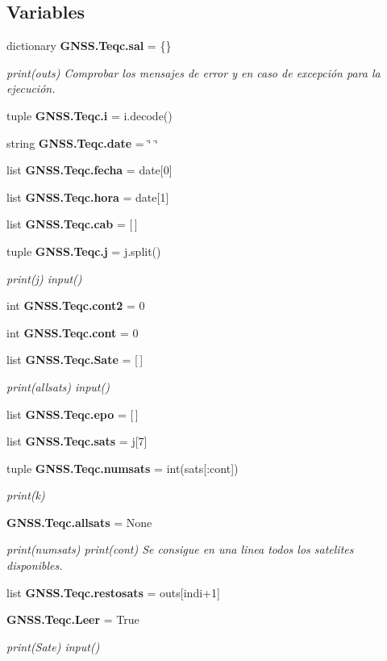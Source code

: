 \subsection*{Variables}
\begin{DoxyCompactItemize}
\item 
dictionary {\bf G\-N\-S\-S.\-Teqc.\-sal} = \{\}
\begin{DoxyCompactList}\small\item\em print(outs) Comprobar los mensajes de error y en caso de excepción para la ejecución. \end{DoxyCompactList}\item 
tuple {\bf G\-N\-S\-S.\-Teqc.\-i} = i.\-decode()
\item 
string {\bf G\-N\-S\-S.\-Teqc.\-date} = \char`\"{} \char`\"{}
\item 
list {\bf G\-N\-S\-S.\-Teqc.\-fecha} = date[0]
\item 
list {\bf G\-N\-S\-S.\-Teqc.\-hora} = date[1]
\item 
list {\bf G\-N\-S\-S.\-Teqc.\-cab} = [$\,$]
\item 
tuple {\bf G\-N\-S\-S.\-Teqc.\-j} = j.\-split()
\begin{DoxyCompactList}\small\item\em print(j) input() \end{DoxyCompactList}\item 
int {\bf G\-N\-S\-S.\-Teqc.\-cont2} = 0
\item 
int {\bf G\-N\-S\-S.\-Teqc.\-cont} = 0
\item 
list {\bf G\-N\-S\-S.\-Teqc.\-Sate} = [$\,$]
\begin{DoxyCompactList}\small\item\em print(allsats) input() \end{DoxyCompactList}\item 
list {\bf G\-N\-S\-S.\-Teqc.\-epo} = [$\,$]
\item 
list {\bf G\-N\-S\-S.\-Teqc.\-sats} = j[7]
\item 
tuple {\bf G\-N\-S\-S.\-Teqc.\-numsats} = int(sats[\-:cont])
\begin{DoxyCompactList}\small\item\em print(k) \end{DoxyCompactList}\item 
{\bf G\-N\-S\-S.\-Teqc.\-allsats} = None
\begin{DoxyCompactList}\small\item\em print(numsats) print(cont) Se consigue en una linea todos los satelites disponibles. \end{DoxyCompactList}\item 
list {\bf G\-N\-S\-S.\-Teqc.\-restosats} = outs[indi+1]
\item 
{\bf G\-N\-S\-S.\-Teqc.\-Leer} = True
\begin{DoxyCompactList}\small\item\em print(\-Sate) input() \end{DoxyCompactList}\end{DoxyCompactItemize}
